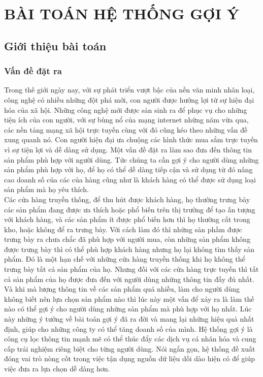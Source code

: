 \chapter{BÀI TOÁN HỆ THỐNG GỢI Ý}
\section{Giới thiệu bài toán}
\subsection{Vấn đề đặt ra}
Trong thế giới ngày nay, với sự phát triển vượt bậc của nền văn minh nhân loại, công nghệ có nhiều những đột phá mới, con người được hưởng lợi từ sự hiện đại hóa của xã hội. Những công nghệ mới được sản sinh ra để phục vụ cho những tiện ích của con người, với sự bùng nổ của mạng internet những năm vừa qua, các nền tảng mạng xã hội trực tuyến cùng với đó cũng kéo theo những vấn đề xung quanh nó. Con người hiện đại ưa chuộng các hình thức mua sắm trực tuyến vì sự tiện lợi và dễ dàng sử dụng. Một vấn đề đặt ra làm sao đưa đến thông tin sản phẩm phù hợp với người dùng. Tức chúng ta cần gợi ý cho người dùng những sản phẩm phù hợp với họ, để họ có thể dễ dàng tiếp cận và sử dụng từ đó nâng cao doanh số của các của hàng cũng như là khách hàng có thể được sử dụng loại sản phẩm mà họ yêu thích.\\
Các cửa hàng truyền thống, để thu hút được khách hàng, họ thường trưng bày các sản phẩm đang được ưa thích hoặc phổ biến trên thị trường để tạo ấn tượng với khách hàng, và các sản phẩm ít được phổ biến hơn thì họ thường cất trong kho, hoặc không để ra trưng bày. Với cách làm đó thì những sản phầm được trưng bày ra chưa chắc đã phù hợp với người mua, còn những sản phẩm không được trưng bày thì có thể phù hợp khách hàng nhưng họ lại không tìm thấy sản phẩm. Đó là một hạn chế với những cửa hàng truyền thống khi họ không thể trưng bày tất cả sản phẩm của họ. Nhưng đối với các cửa hàng trực tuyến thì tất cả sản phẩm của họ được đưa đến với người dùng những thông tin đầy đủ nhất. Và khi mà lượng thông tin về các sản phẩm quá nhiều, làm cho người dùng không biết nên lựa chọn sản phẩm nào thì lúc này một vấn để xảy ra là làm thế nào có thể gợi ý cho người dùng những sản phẩm mà phù hợp với họ nhất. Lúc này những ý tưởng về bài toán gợi ý đã ra đời và mang lại những hiệu quả nhất định, giúp cho những công ty có thể tăng doanh số của mình. Hệ thống gợi ý là công cụ lọc thông tin mạnh mẽ có thể thúc đẩy các dịch vụ cá nhân hóa và cung cấp trải nghiệm riêng biệt cho từng người dùng. Nói ngắn gọn, hệ thống đề xuất đóng vai trò nòng cốt trong việc tận dụng nguồn dữ liệu dồi dào hiện có để giúp việc đưa ra lựa chọn dễ dàng hơn.
